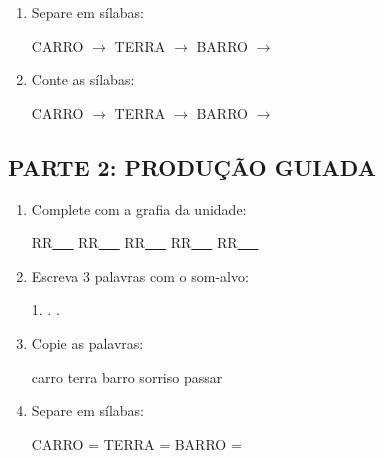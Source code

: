 \begin{exercicio}
\begin{enumerate}
  \item Separe em sílabas:
  \begin{center}
  CARRO $\rightarrow$ \underline{\hspace{1cm}} \quad TERRA $\rightarrow$ \underline{\hspace{1cm}} \quad BARRO $\rightarrow$ \underline{\hspace{1cm}}
  \end{center}

  \item Conte as sílabas:
  \begin{center}
  CARRO $\rightarrow$ \underline{\hspace{0.9cm}} \quad TERRA $\rightarrow$ \underline{\hspace{0.9cm}} \quad BARRO $\rightarrow$ \underline{\hspace{0.9cm}}
  \end{center}

\end{enumerate}

\subsection*{PARTE 2: PRODUÇÃO GUIADA}

\begin{enumerate}[resume]

  \item Complete com a grafia da unidade:
  \begin{center}
  RR\underline{~~~} \quad RR\underline{~~~} \quad RR\underline{~~~} \quad RR\underline{~~~} \quad RR\underline{~~~}
  \end{center}

  \item Escreva 3 palavras com o som-alvo:
  \begin{center}
  1. \underline{\hspace{3cm}} . \underline{\hspace{3cm}} . \underline{\hspace{3cm}}
  \end{center}

  \item Copie as palavras:
  \begin{center}
  carro \quad terra \quad barro \quad sorriso \quad passar
  \end{center}

  \item Separe em sílabas:
  \begin{center}
  CARRO = \underline{\hspace{1cm}} \underline{\hspace{1cm}} \quad TERRA = \underline{\hspace{1cm}} \underline{\hspace{1cm}} \quad BARRO = \underline{\hspace{1cm}} \underline{\hspace{1cm}}
  \end{center}


\end{enumerate}
\end{exercicio}

